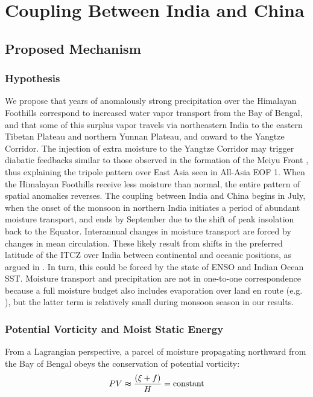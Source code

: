 \documentclass[12pt]{article}
\begin{document}
\section{Coupling Between India and China}

\subsection{Proposed Mechanism}

\subsubsection{Hypothesis}

	We propose that years of anomalously strong precipitation over the Himalayan Foothills correspond to increased water vapor transport from the Bay of Bengal, and that some of this surplus vapor travels via northeastern India to the eastern Tibetan Plateau and northern Yunnan Plateau, and onward to the Yangtze Corridor. The injection of extra moisture to the Yangtze Corridor may trigger diabatic feedbacks similar to those observed in the formation of the Meiyu Front \citep{Sampe2010}, thus explaining the tripole pattern over East Asia seen in All-Asia EOF 1. When the Himalayan Foothills receive less moisture than normal, the entire pattern of spatial anomalies reverses. The coupling between India and China begins in July, when the onset of the monsoon in northern India initiates a period of abundant moisture transport, and ends by September due to the shift of peak insolation back to the Equator. Interannual changes in moisture transport are forced by changes in mean circulation. These likely result from shifts in the preferred latitude of the ITCZ over India between continental and oceanic positions, as argued in \cite{Gadgil2003}. In turn, this could be forced by the state of ENSO and Indian Ocean SST. Moisture transport and precipitation are not in one-to-one correspondence because a full moisture budget also includes evaporation over land en route (e.g. \cite{Chen2014b}), but the latter term is relatively small during monsoon season in our results.
		
\subsubsection{Potential Vorticity and Moist Static Energy}

	From a Lagrangian perspective, a parcel of moisture propagating northward from the Bay of Bengal obeys the conservation of potential vorticity:
	\begin{displaymath}
			PV  \thickapprox \frac{\left(\xi+f\right)}{H}  = \mathrm{ constant}
	\end{displaymath}
	
\end{document}
